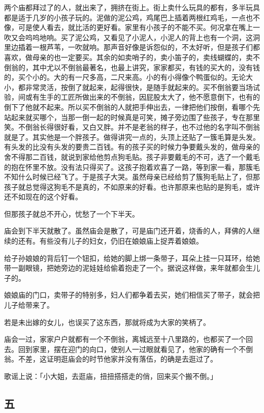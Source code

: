 \documentclass[UTF8]{ctexart}
\begin{document}
两个庙都拜过了的人，就出来了，拥挤在街上。街上卖什么玩具的都有，多半玩具都是适于几岁的小孩子玩的。泥做的泥公鸡，鸡尾巴上插着两根红鸡毛，一点也不像，可是使人看去，就比活的更好看。家里有小孩子的不能不买。何况拿在嘴上一吹又会呜呜地响。买了泥公鸡，又看见了小泥人，小泥人的背上也有一个洞，这洞里边插着一根芦苇，一吹就响。那声音好像是诉怨似的，不太好听，但是孩子们都喜欢，做母亲的也一定要买。其余的如卖哨子的，卖小笛子的，卖线蝴蝶的，卖不倒翁的，其中尤以不倒翁最著名，也最上讲究，家家都买，有钱的买大的，没有钱的，买个小的。大的有一尺多高，二尺来高。小的有小得像个鸭蛋似的。无论大小，都非常灵活，按倒了就起来，起得很快，是随手就起来的。买不倒翁要当场试验，间或有生手的工匠所做出来的不倒翁，因屁股太大了，他不愿意倒下，也有的倒下了他就不起来。所以买不倒翁的人就把手伸出去，一律把他们按倒，看哪个先站起来就买哪个，当那一倒一起的时候真是可笑，摊子旁边围了些孩子，专在那里笑。不倒翁长得很好看，又白又胖。并不是老翁的样子，也不过他的名字叫不倒翁就是了。其实他是一个胖孩子。做得讲究一点的，头顶上还贴了一簇毛算是头发。有头发的比没有头发的要贵二百钱。有的孩子买的时候力争要戴头发的，做母亲的舍不得那二百钱，就说到家给他剪点狗毛贴。孩子非要戴毛的不可，选了一个戴毛的抱在怀里不放。没有法只得买了。这孩子抱着欢喜了一路，等到家一看，那簇毛不知什么时候已经飞了。于是孩子大哭。虽然母亲已经给剪了簇狗毛贴上了，但那孩子就总觉得这狗毛不是真的，不如原来的好看。也许那原来也贴的是狗毛，或许还不如现在的这个好看。

但那孩子就总不开心，忧愁了一个下半天。

庙会到下半天就散了。虽然庙会是散了，可是庙门还开着，烧香的人，拜佛的人继续的还有。有些没有儿子的妇女，仍旧在娘娘庙上捉弄着娘娘。

给子孙娘娘的背后钉一个钮扣，给她的脚上绑一条带子，耳朵上挂一只耳环，给她带一副眼镜，把她旁边的泥娃娃给偷着抱走了一个。据说这样做，来年就都会生儿子的。

娘娘庙的门口，卖带子的特别多，妇人们都争着去买，她们相信买了带子，就会把儿子给带来了。

若是未出嫁的女儿，也误买了这东西，那就将成为大家的笑柄了。

庙会一过，家家户户就都有一个不倒翁，离城远至十八里路的，也都买了一个回去。回到家里，摆在迎门的向口，使别人一过眼就看见了，他家的确有一个不倒翁。不差，这证明逛庙会的时节他家并没有落伍，的确是去逛过了。

歌谣上说：「小大姐，去逛庙，扭扭搭搭走的俏，回来买个搬不倒。」

\subsection{五}
\end{document}
